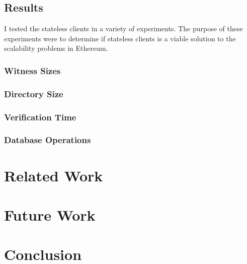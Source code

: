 \documentclass[12pt]{article}
\begin{document}
\subsection{Results}

I tested the stateless clients in a variety of experiments. The purpose of these experiments were to determine if stateless clients is a viable solution to the scalability problems in Ethereum.

\subsubsection{Witness Sizes}

\subsubsection{Directory Size}

\subsubsection{Verification Time}

\subsubsection{Database Operations}

\section{Related Work}

\section{Future Work}

\section{Conclusion}
\end{document}
